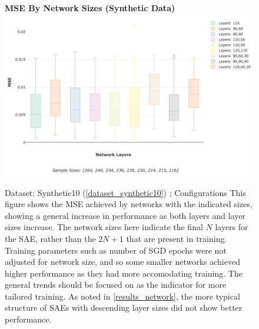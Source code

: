 \documentclass[a4paper,11pt,oneside]{article}
\theoremstyle{plain}
\theoremstyle{definition}
\begin{document}
\begin{figure}[H]
	\centering 
	\textbf{MSE By Network Sizes (Synthetic Data)}
	\includegraphics[scale=0.25]{images/results/network/synth_mse_box.png} 
	\caption{Dataset: Synthetic10 (\ref{dataset_synthetic10}) ; Configurations 
		\newline This figure shows the MSE achieved by networks with the indicated sizes, showing a general increase in performance as both layers and layer sizes increase. The network sizes here indicate the final $N$ layers for the SAE, rather than the $2N + 1$ that are present in training. Training parameters such as number of SGD epochs were not adjusted for network size, and so some smaller networks achieved higher performance as they had more accomodating training. The general trends should be focused on as the indicator for more tailored training. As noted in \ref{results_network}, the more typical structure of SAEs with descending layer sizes did not show better performance.}
	\label{figure-synth_mse_box}
\end{figure}
\end{document}
